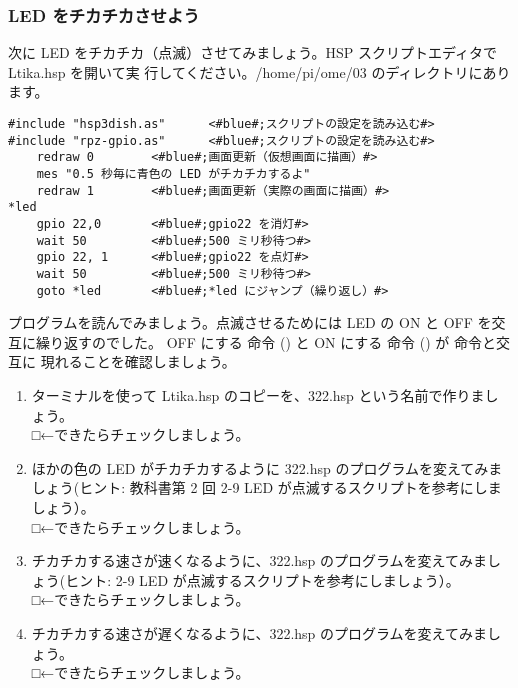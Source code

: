 \subsubsection{LED をチカチカさせよう}

次に LED をチカチカ（点滅）させてみましょう。HSP スクリプトエディタで Ltika.hsp を開いて実
行してください。/home/pi/ome/03 のディレクトリにあります。\\

\begin{lstlisting}[caption=Ltika.hsp,label=Ltika.hsp]
#include "hsp3dish.as"		<#blue#;スクリプトの設定を読み込む#>
#include "rpz-gpio.as"		<#blue#;スクリプトの設定を読み込む#>
	redraw 0		<#blue#;画面更新（仮想画面に描画）#>
	mes "0.5 秒毎に青色の LED がチカチカするよ"
	redraw 1		<#blue#;画面更新（実際の画面に描画）#>
*led
	gpio 22,0		<#blue#;gpio22 を消灯#>
	wait 50 		<#blue#;500 ミリ秒待つ#>
	gpio 22, 1 		<#blue#;gpio22 を点灯#>
	wait 50 		<#blue#;500 ミリ秒待つ#>
	goto *led 		<#blue#;*led にジャンプ（繰り返し）#>
\end{lstlisting}

プログラムを読んでみましょう。点滅させるためには LED の ON と OFF を交互に繰り返すのでした。
OFF にする  命令 () と ON にする  命令 () が  命令と交互に
現れることを確認しましょう。\\

\begin{tcolorbox}[title=\useOmetoi]
\begin{enumerate}
\item ターミナルを使って Ltika.hsp のコピーを、322.hsp という名前で作りましょう。\\
□←できたらチェックしましょう。
\item ほかの色の LED がチカチカするように 322.hsp のプログラムを変えてみましょう(ヒント:
教科書第 2 回 2-9 LED が点滅するスクリプトを参考にしましょう）。\\
□←できたらチェックしましょう。
\item チカチカする速さが速くなるように、322.hsp のプログラムを変えてみましょう(ヒント: 2-9 
LED が点滅するスクリプトを参考にしましょう）。\\
□←できたらチェックしましょう。
\item チカチカする速さが遅くなるように、322.hsp のプログラムを変えてみましょう。\\
□←できたらチェックしましょう。
\end{enumerate}
\end{tcolorbox}